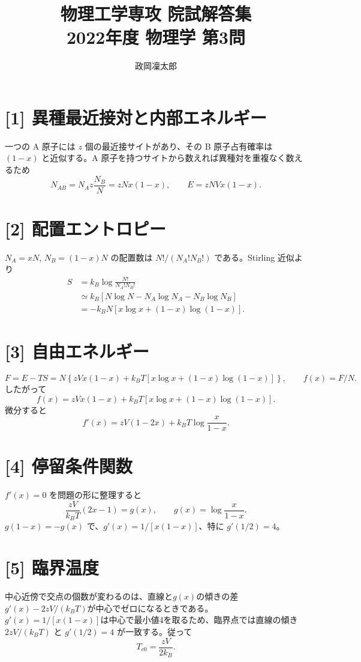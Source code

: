 \documentclass[11pt,a4paper]{article}
\title{物理工学専攻 院試解答集\\2022年度 物理学 第3問}
\author{政岡凜太郎}
\date{}
\begin{document}
\maketitle

\section*{[1] 異種最近接対と内部エネルギー}
一つの A 原子には $z$ 個の最近接サイトがあり、その B 原子占有確率は $(1-x)$ と近似する。A 原子を持つサイトから数えれば異種対を重複なく数えるため
\[
N_{AB}=N_Az\frac{N_B}{N}=zNx(1-x),\qquad
\boxed{E=zNVx(1-x)}.
\]

\section*{[2] 配置エントロピー}
$N_A=xN$, $N_B=(1-x)N$ の配置数は $N!/(N_A!N_B!)$ である。Stirling 近似より
\begin{align*}
S&=k_B\log\frac{N!}{N_A!N_B!}\\
&\simeq k_B[N\log N-N_A\log N_A-N_B\log N_B]\\
&=\boxed{-k_BN[x\log x+(1-x)\log(1-x)]}.
\end{align*}

\section*{[3] 自由エネルギー}
\[
\boxed{F=E-TS=N\left\{zVx(1-x)+k_BT[x\log x+(1-x)\log(1-x)]\right\}},
\qquad f(x)=F/N.
\]
したがって
\[
f(x)=zVx(1-x)+k_BT[x\log x+(1-x)\log(1-x)].
\]
微分すると
\[
f'(x)=zV(1-2x)+k_BT\log\frac{x}{1-x}.
\]

\section*{[4] 停留条件関数}
$f'(x)=0$ を問題の形に整理すると
\[
\frac{zV}{k_BT}(2x-1)=g(x),\qquad \boxed{g(x)=\log\frac{x}{1-x}}.
\]
$g(1-x)=-g(x)$ で、$g'(x)=1/[x(1-x)]$、特に $g'(1/2)=4$。

\section*{[5] 臨界温度}
中心近傍で交点の個数が変わるのは、直線と$g(x)$の傾きの差$g'(x)-2zV/(k_BT)$が中心でゼロになるときである。$g'(x)=1/[x(1-x)]$は中心で最小値4を取るため、臨界点では直線の傾き $2zV/(k_BT)$ と $g'(1/2)=4$ が一致する。従って
\[
\boxed{T_{c0}=\frac{zV}{2k_B}}.
\]
\end{document}
